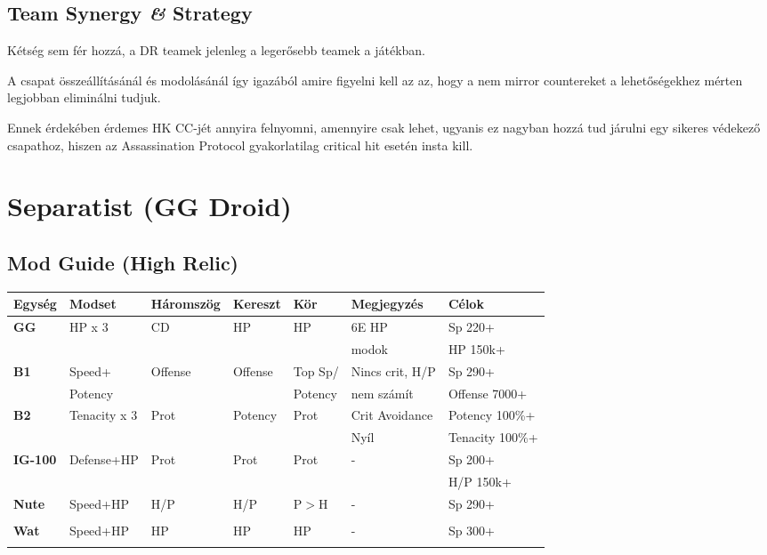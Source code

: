 \documentclass[11pt]{report}
\begin{document}
\section{Team Synergy \textit{\&} Strategy}
Kétség sem fér hozzá, a DR teamek jelenleg a legerősebb teamek a játékban. \par
A csapat összeállításánál és modolásánál így igazából amire figyelni kell az az, hogy a nem mirror countereket a lehetőségekhez mérten legjobban eliminálni tudjuk.\par
Ennek érdekében érdemes HK CC-jét annyira felnyomni, amennyire csak lehet, ugyanis ez nagyban hozzá tud járulni egy sikeres védekező csapathoz, hiszen az Assassination Protocol gyakorlatilag critical hit esetén insta kill. 


\chapter{Separatist (GG Droid)}
\section{Mod Guide (High Relic)}
\begin{center}
    \begin{tabular}{|l | l | l | l | l | l | l |}
        \hline
        Egység & Modset & Háromszög & Kereszt & Kör & Megjegyzés & Célok\\ \hline
        \textbf{GG} & HP x 3 & CD & HP & HP & 6E HP & Sp 220+\\
        &  &  &  &  & modok & HP 150k+\\ \hline
        \textbf{B1} & Speed+ & Offense & Offense & Top Sp/ & Nincs crit, H/P & Sp 290+\\
        & Potency &  &  & Potency & nem számít & Offense 7000+\\ \hline
        \textbf{B2} & Tenacity x 3 & Prot & Potency & Prot & Crit Avoidance & Potency 100\%+\\
        &  &  &  &  & Nyíl & Tenacity 100\%+\\ \hline
        \textbf{IG-100} & Defense+HP & Prot & Prot & Prot & - & Sp 200+\\
        &  &  &  &  &  & H/P 150k+\\ \hline
        \textbf{Nute} & Speed+HP & H/P & H/P & P$>$H & - & Sp 290+\\
        &  &  &  &  &  & \\ \hline
        \textbf{Wat} & Speed+HP & HP & HP & HP & - & Sp 300+\\
        &  &  &  &  &  & \\ \hline        
    \end{tabular}
\end{center}
\end{document}
